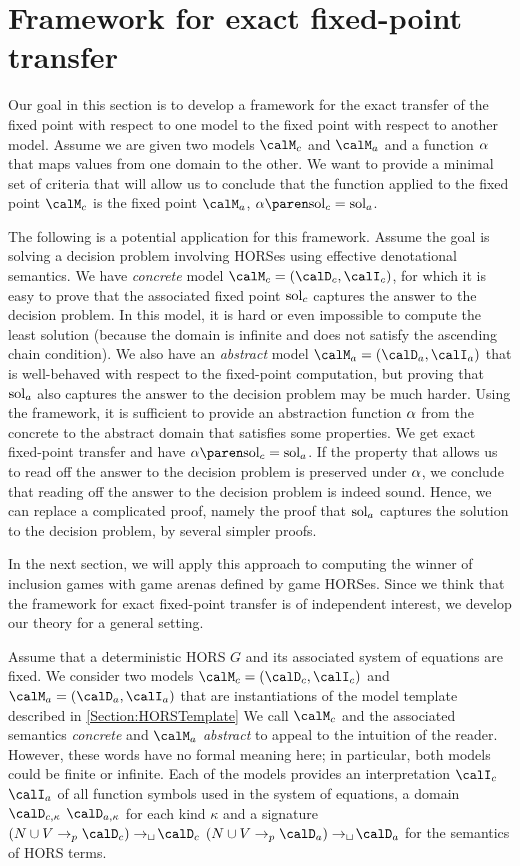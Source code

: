 \documentclass[../../diss.tex]{subfiles}
\begin{document}
\section{Framework for exact fixed-point transfer}%
\label{Section:HOGamesFramework}%

Our goal in this section is to develop a framework for the exact transfer of the fixed point with respect to one model to the fixed point with respect to another model.
Assume we are given two models $\modelc$ and $\modela$ and a function $\abs$ that maps values from one domain to the other.
We want to provide a minimal set of criteria that will allow us to conclude that the function applied to the fixed point \wrt $\modelc$ is the fixed point \wrt $\modela$, $\abs{\solc} = \sola$.

The following is a potential application for this framework.
Assume the goal is solving a decision problem involving HORSes using effective denotational semantics.
We have \emph{concrete} model $\modelc = (\domainc,\interpretationc)$, for which it is easy to prove that the associated fixed point $\solc$ captures the answer to the decision problem.
In this model, it is hard or even impossible to compute the least solution (\eg because the domain is infinite and does not satisfy the ascending chain condition).
We also have an \emph{abstract} model $\modela = (\domaina,\interpretationa)$ that is well-behaved with respect to the fixed-point computation, but proving that $\sola$ also captures the answer to the decision problem may be much harder.
Using the framework, it is sufficient to provide an abstraction function $\abs$ from the concrete to the abstract domain that satisfies some properties.
We get exact fixed-point transfer and have $\abs{\solc} = \sola$.
If the property that allows us to read off the answer to the decision problem is preserved under $\abs$, we conclude that reading off the answer to the decision problem is indeed sound.
Hence, we can replace a complicated proof, namely the proof that $\sola$ captures the solution to the decision problem, by several simpler proofs.

In the next section, we will apply this approach to computing the winner of inclusion games with game arenas defined by game HORSes.
Since we think that the framework for exact fixed-point transfer is of independent interest, we develop our theory for a general setting.

Assume that a deterministic HORS $G$ and its associated system of equations are fixed.
We consider two models $\modelc = (\domainc,\interpretationc)$ and $\modela = (\domaina,\interpretationa)$ that are instantiations of the model template described in \cref{Section:HORSTemplate}
We call $\modelc$ and the associated semantics \emph{concrete} and $\modela$ \emph{abstract} to appeal to the intuition of the reader.
However, these words have no formal meaning here; in particular, both models could be finite or infinite.
Each of the models provides an interpretation $\interpretationc$ \resp $\interpretationa$ of all function symbols used in the system of equations, a domain $\domainc{\kappa}$ \resp $\domaina{\kappa}$ for each kind $\kappa$ and a signature $(N \cup V \pto \domainc) \cto \domainc$ \resp $(N \cup V \pto \domaina) \cto \domaina$ for the semantics of HORS terms.
\end{document}
